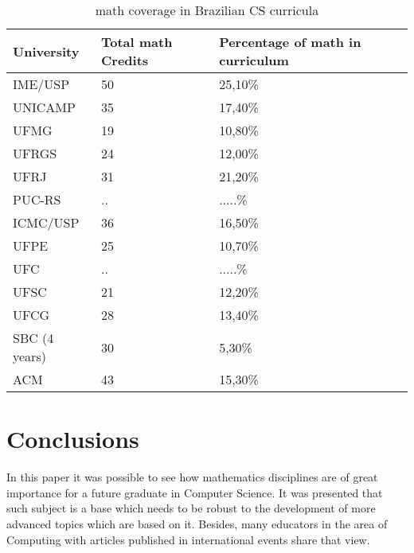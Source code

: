 \documentclass[conference]{IEEEtran}
\begin{document}
\begin{table}
	\centering
	\caption{math coverage in Brazilian CS curricula}
    \begin{tabular}{|p{2cm}|p{2cm}|p{2cm}|}
        \hline
        University & Total math Credits                    & Percentage of math in curriculum          \\ \hline
        IME/USP      & 50                                  & 25,10\%                                   \\ 
        UNICAMP      & 35                                  & 17,40\%                                   \\ 
        UFMG         & 19                                  & 10,80\%                                   \\ 
        UFRGS        & 24                                  & 12,00\%                                   \\ 
        UFRJ         & 31                                  & 21,20\%                                   \\ 
        PUC-RS       & ..                                  & .....\%                                   \\ 
        ICMC/USP     & 36                                  & 16,50\%                                   \\ 
        UFPE         & 25                                  & 10,70\%                                   \\ 
        UFC          & ..                                  & .....\%                                   \\ 
        UFSC         & 21                                  & 12,20\%                                   \\ 
        UFCG         & 28                                  & 13,40\%                                   \\ 
        SBC (4 years)& 30                                  & 5,30\%                                    \\ 
        ACM          & 43                                  & 15,30\%                                   \\
        \hline
    \end{tabular}
\end{table}

\section{Conclusions}
	In this paper it was possible to see how mathematics disciplines are of great importance for a future graduate in Computer Science. It was presented that such subject is a base which needs to be robust to the development of more advanced topics which are based on it. Besides, many educators in the area of Computing with articles published in international events share that view.
\end{document}
